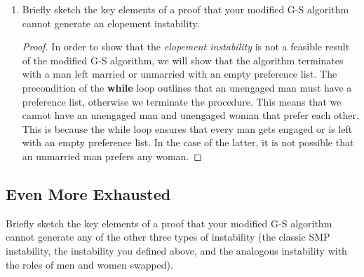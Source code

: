 \documentclass[11pt, oneside]{article}   	%
\theoremstyle{definition}
\theoremstyle{remark}
\begin{document}
\begin{enumerate}
\begin{enumerate}
   \end{enumerate}
	\item Briefly sketch the key elements of a proof that your modified G-S algorithm cannot generate an elopement instability.
	
	\begin{proof}
		In order to show that the \textit{elopement instability} is not a feasible result of the modified G-S algorithm, we will show that the algorithm terminates with a man left married or unmarried  with an empty preference list. The precondition of the \textbf{while} loop outlines that an unengaged man must have a preference list, otherwise we terminate the procedure. This means that we cannot have an unengaged man and unengaged woman that prefer each other. This is because the while loop ensures that every man gets engaged or is left with an empty preference list. In the case of the latter, it is not possible that an unmarried man prefers any woman.
	\end{proof}
\end{enumerate}

\subsection{Even More Exhausted}
Briefly sketch the key elements of a proof that your modified G-S
algorithm cannot generate any of the other three types of instability
(the classic SMP instability, the instability you defined above, and
the analogous instability with the roles of men and women swapped).
\end{document}
